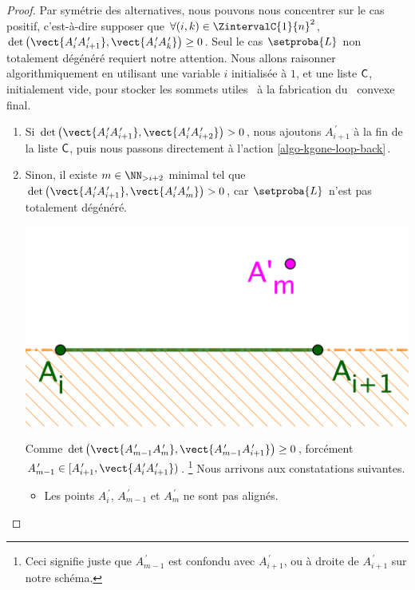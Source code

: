 \begin{proof}
    Par symétrie des alternatives, nous pouvons nous concentrer sur le cas positif, c'est-à-dire supposer que
    $\forall (i, k) \in \ZintervalC{1}{n}^2$,
	$\det \big( \vect{A^{\,\prime}_i A^{\,\prime}_{i+1}}, \vect{A^{\,\prime}_i A^{\,\prime}_k} \big) \geq 0$.
	Seul le cas $\setproba{L}$ non totalement dégénéré requiert notre attention.
	Nous allons raisonner algorithmiquement en utilisant
	une variable $i$ initialisée à $1$, 
	et une liste $\mathsf{C}$, initialement vide, pour stocker les sommets \og utiles \fg\ à la fabrication du \kgone\ convexe final.
	\begin{enumerate}[label=\fbox{\small\bfseries\textsf{A\kern.25pt\arabic*}}]
    	\item \label{algo-kgone-start}
	    Si 
		$\det \big( \vect{A^{\,\prime}_i A^{\,\prime}_{i+1}}, \vect{A^{\,\prime}_i A^{\,\prime}_{i+2}} \big) > 0$,
		nous ajoutons $A^{\,\prime}_{i+1}$ à la fin de la liste $\mathsf{C}$,
		puis nous passons directement à l'action \ref{algo-kgone-loop-back}\,.


    	\item \label{algo-kgone-remove-vertices}
        Sinon, il existe 
	    $m \in \NN_{>i+2}$ minimal tel que
		$\det \big( \vect{A^{\,\prime}_i A^{\,\prime}_{i+1}}, \vect{A^{\,\prime}_i A^{\,\prime}_m} \big) > 0$, car $\setproba{L}$ n'est pas totalement dégénéré.
        \begin{center}
        	\includegraphics[scale=.4]{content/polygon/at-least-one/algo-kgone-remove-vertices.png}
        \end{center}
        
        \noindent
        Comme 
        $\det \big( \vect{A^{\,\prime}_{m-1} A^{\,\prime}_m}, \vect{A^{\,\prime}_{m-1} A^{\,\prime}_{i+1}} \big) \geq 0$, 
        forcément
        $A^{\,\prime}_{m-1} \in [ A^{\,\prime}_{i+1} , \vect{A^{\,\prime}_i A^{\,\prime}_{i+1}} )$.%
        \footnote{
        	Ceci signifie juste que $A^{\,\prime}_{m-1}$ est confondu avec $A^{\,\prime}_{i+1}$, ou  à droite de $A^{\,\prime}_{i+1}$ sur notre schéma.
        }
        Nous arrivons aux constatations suivantes.
        \begin{itemize}
            \item Les points $A^{\,\prime}_i$, $A^{\,\prime}_{m-1}$ et $A^{\,\prime}_m$ ne sont pas alignés.


\end{itemize}
\end{enumerate}
\end{proof}
